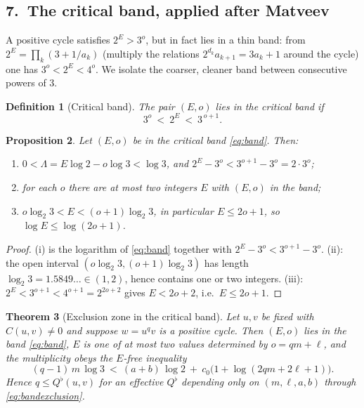 \documentclass[11pt,a4paper]{article}
\theoremstyle{bourbaki}
\newtheorem{thm}{Theorem}[section]
\newtheorem{prop}[thm]{Proposition}
\theoremstyle{bourbakidef}
\newtheorem{defn}[thm]{Definition}
\begin{document}
\subsection*{7.\ The critical band, applied after Matveev}

A positive cycle satisfies $2^{E}>3^{o}$, but in fact lies in a thin band: from
$2^{E}=\prod_{k}(3+1/a_{k})$ (multiply the relations $2^{d_{k}}a_{k+1}=3a_{k}+1$ around the
cycle) one has $3^{o}<2^{E}<4^{o}$. We isolate the coarser, cleaner band between consecutive
powers of $3$.

\begin{defn}[Critical band]\label{def:critical}
The pair $(E,o)$ lies in the \emph{critical band} if
\begin{equation}\label{eq:band}
   3^{o}\ <\ 2^{E}\ <\ 3^{\,o+1}.
\end{equation}
\end{defn}

\begin{prop}\label{prop:band}
Let $(E,o)$ be in the critical band \eqref{eq:band}. Then:
\begin{enumerate}
\item[\rm(i)] $0<\Lambda=E\log2-o\log3<\log 3$, and
   $2^{E}-3^{o}<3^{o+1}-3^{o}=2\cdot 3^{o}$;
\item[\rm(ii)] for each $o$ there are at most two integers $E$ with $(E,o)$ in the band;
\item[\rm(iii)] $o\log_{2}3<E<(o+1)\log_{2}3$, in particular $E\le 2o+1$, so
   $\log E\le\log(2o+1)$.
\end{enumerate}
\end{prop}

\begin{proof}
(i) is the logarithm of \eqref{eq:band} together with
$2^{E}-3^{o}<3^{o+1}-3^{o}$. (ii): the open interval $(o\log_{2}3,(o+1)\log_{2}3)$ has
length $\log_{2}3=1.5849\ldots\in(1,2)$, hence contains one or two integers. (iii):
$2^{E}<3^{o+1}<4^{o+1}=2^{2o+2}$ gives $E<2o+2$, i.e.\ $E\le 2o+1$.
\end{proof}

\begin{thm}[Exclusion zone in the critical band]\label{thm:bandexclusion}
Let $u,v$ be fixed with $C(u,v)\ne 0$ and suppose $w=u^{q}v$ is a positive cycle. Then
$(E,o)$ lies in the band \eqref{eq:band}, $E$ is one of at most two values determined by
$o=qm+\ell$, and the multiplicity obeys the $E$-free inequality
\begin{equation}\label{eq:bandexclusion}
   (q-1)\,m\,\log 3\ <\ (a+b)\,\log 2\ +\ c_{0}\bigl(1+\log(2qm+2\ell+1)\bigr).
\end{equation}
Hence $q\le Q^{\flat}(u,v)$ for an effective $Q^{\flat}$ depending only on
$(m,\ell,a,b)$ through \eqref{eq:bandexclusion}.
\end{thm}
\end{document}
